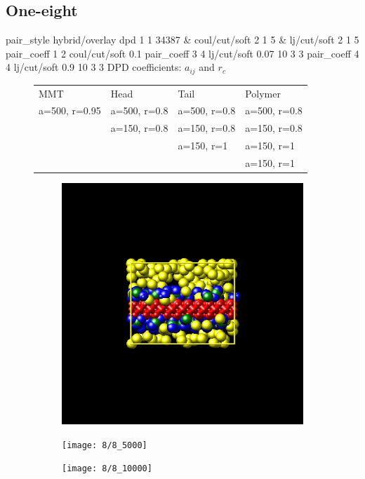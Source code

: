 \documentclass[a4paper]{article}
\begin{document}
\subsection*{One-eight}
pair\_style hybrid/overlay dpd 1 1 34387 \& coul/cut/soft 2 1 5 \& 
lj/cut/soft 2 1 5\newline
pair\_coeff 1 2 coul/cut/soft 0.1\newline
pair\_coeff 3 4 lj/cut/soft 0.07    10 3 3\newline
pair\_coeff 4 4 lj/cut/soft 0.9     10 3 3\newline
DPD coefficients: $a_{ij}$ and $r_c$
\begin{figure}[H]\begin{tabular}{llll}
MMT           & Head         & Tail         & Polymer      \\
a=500, r=0.95 & a=500, r=0.8 & a=500, r=0.8 & a=500, r=0.8 \\
              & a=150, r=0.8 & a=150, r=0.8 & a=150, r=0.8 \\
              &              & a=150, r=1   & a=150, r=1   \\
              &              &              & a=150, r=1   \\
\end{tabular}\end{figure}

\begin{figure}[H]
\begin{subfigure}{0.3\textwidth}
  \centering
  \includegraphics[width=\linewidth,keepaspectratio]{start}
  \caption{}
\end{subfigure}
\begin{subfigure}{0.3\textwidth}
  \centering
  \texttt{[image: 8/8\_5000]}
  \caption{}
\end{subfigure}
\begin{subfigure}{0.3\textwidth}
  \centering
  \texttt{[image: 8/8\_10000]}
  \caption{}
\end{subfigure}
\caption{}
\label{fig_1}
\end{figure}
\end{document}
